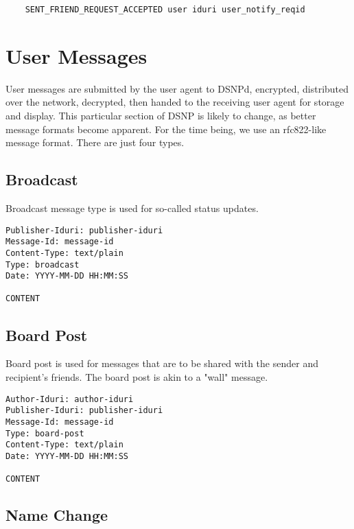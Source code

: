\documentclass[letterpaper,11pt,oneside]{article}
\begin{document}
\vspace{10pt}
\begin{verbatim}
    SENT_FRIEND_REQUEST_ACCEPTED user iduri user_notify_reqid
\end{verbatim}
\vspace{10pt}

\section{User Messages}

User messages are submitted by the user agent to DSNPd, encrypted, distributed
over the network, decrypted, then handed to the receiving user agent for
storage and display. This particular section of DSNP is likely to change, as
better message formats become apparent. For the time being, we use an
rfc822-like message format. There are just four types.

\subsection{Broadcast}

Broadcast message type is used for so-called status updates.

\vspace{10pt}
\begin{verbatim}
Publisher-Iduri: publisher-iduri
Message-Id: message-id
Content-Type: text/plain
Type: broadcast
Date: YYYY-MM-DD HH:MM:SS

CONTENT
\end{verbatim}
\vspace{10pt}

\subsection{Board Post}

Board post is used for messages that are to be shared with the sender and
recipient's friends. The board post is akin to a "wall" message.

\vspace{10pt}
\begin{verbatim}
Author-Iduri: author-iduri
Publisher-Iduri: publisher-iduri
Message-Id: message-id
Type: board-post
Content-Type: text/plain
Date: YYYY-MM-DD HH:MM:SS

CONTENT
\end{verbatim}
\vspace{10pt}

\subsection{Name Change}
\end{document}
